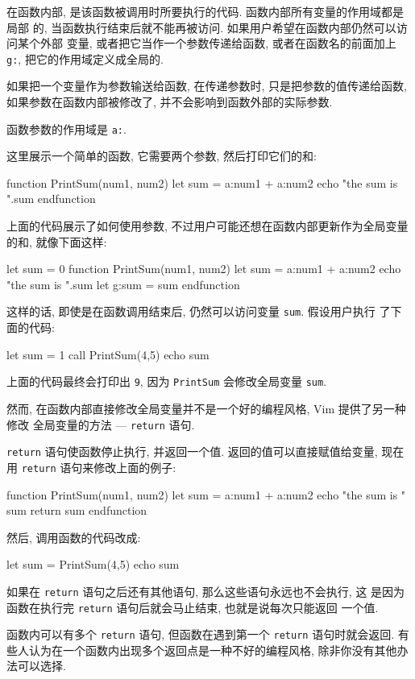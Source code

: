 在函数内部, 是该函数被调用时所要执行的代码. 函数内部所有变量的作用域都是局部
的, 当函数执行结束后就不能再被访问. 如果用户希望在函数内部仍然可以访问某个外部
变量, 或者把它当作一个参数传递给函数, 或者在函数名的前面加上 \texttt{g:},
把它的作用域定义成全局的.
\begin{warning}
    如果把一个变量作为参数输送给函数, 在传递参数时, 只是把参数的值传递给函数,
    如果参数在函数内部被修改了, 并不会影响到函数外部的实际参数.
\end{warning}

函数参数的作用域是 \texttt{a:}.

这里展示一个简单的函数, 它需要两个参数, 然后打印它们的和:
\begin{vimcode}
function PrintSum(num1, num2)
    let sum = a:num1 + a:num2
    echo "the sum is ".sum
endfunction
\end{vimcode}
上面的代码展示了如何使用参数, 不过用户可能还想在函数内部更新作为全局变量的和,
就像下面这样:
\begin{vimcode}
let sum = 0
function PrintSum(num1, num2)
    let sum = a:num1 + a:num2
    echo "the sum is ".sum
    let g:sum = sum
endfunction
\end{vimcode}
这样的话, 即使是在函数调用结束后, 仍然可以访问变量 \texttt{sum}. 假设用户执行
了下面的代码:
\begin{vimcode}
let sum = 1
call PrintSum(4,5)
echo sum
\end{vimcode}
上面的代码最终会打印出 \texttt{9}, 因为 \texttt{PrintSum} 会修改全局变量
\texttt{sum}.

然而, 在函数内部直接修改全局变量并不是一个好的编程风格, Vim 提供了另一种修改
全局变量的方法 --- \texttt{return} 语句.

\texttt{return} 语句使函数停止执行, 并返回一个值. 返回的值可以直接赋值给变量,
现在用 \texttt{return} 语句来修改上面的例子:
\begin{vimcode}
function PrintSum(num1, num2)
    let sum = a:num1 + a:num2
    echo "the sum is " sum
    return sum
endfunction
\end{vimcode}
然后, 调用函数的代码改成:
\begin{vimcode}
let sum = PrintSum(4,5)
echo sum
\end{vimcode}

如果在 \texttt{return} 语句之后还有其他语句, 那么这些语句永远也不会执行, 这
是因为函数在执行完 \texttt{return} 语句后就会马止结束, 也就是说每次只能返回
一个值.

\begin{warning}
    函数内可以有多个 \texttt{return} 语句, 但函数在遇到第一个 \texttt{return}
    语句时就会返回. 有些人认为在一个函数内出现多个返回点是一种不好的编程风格,
    除非你没有其他办法可以选择.
\end{warning}

